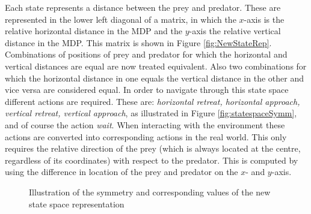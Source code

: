 Each state represents a distance between the prey and predator. These are represented in the lower left diagonal of a matrix, in which the $x$-axis is the relative horizontal distance in the MDP and the $y$-axis the relative vertical distance in the MDP. This matrix is shown in Figure \ref{fig:NewStateRep}. Combinations of positions of prey and predator for which the horizontal and vertical distances are equal are now treated equivalent. 
Also two combinations for which the horizontal distance in one equals the vertical distance in the other and vice versa are considered equal. In order to navigate through this state space different actions are required. These are: \textit{horizontal retreat, horizontal approach, vertical retreat, vertical approach}, as illustrated in Figure \ref{fig:statespaceSymm}, and of course the action \textit{wait}. When interacting with the environment these actions are converted into corresponding actions in the real world. This only requires the relative direction of the prey (which is always located at the centre, regardless of its coordinates) with respect to the predator. This is computed by using the difference in location of the prey and predator on the $x$- and $y$-axis.

\begin{figure}[ht]
\centering
{}
\caption{Illustration of the symmetry and corresponding values of the new state space representation}
\label{fig:statespaceIll}
\end{figure}


